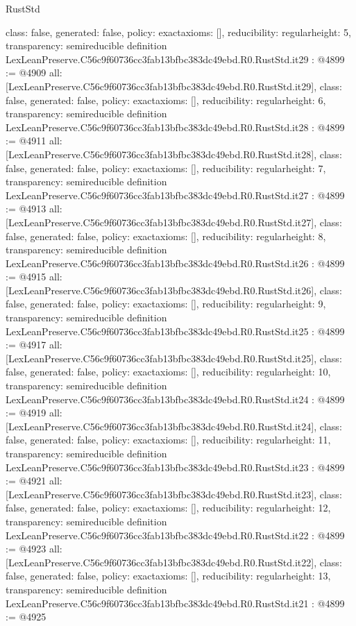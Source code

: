 \begin{lexlean}{RustStd}
\begin{coremodule}
{  class: false,
  generated: false,
  policy: exact{axioms: []},
  reducibility: regular{height: 5},
  transparency: semireducible
}
definition LexLeanPreserve.C56c9f60736cc3fab13bfbc383dc49ebd.R0.RustStd.it29 : @4899 := @4909 {
  all: [LexLeanPreserve.C56c9f60736cc3fab13bfbc383dc49ebd.R0.RustStd.it29],
  class: false,
  generated: false,
  policy: exact{axioms: []},
  reducibility: regular{height: 6},
  transparency: semireducible
}
definition LexLeanPreserve.C56c9f60736cc3fab13bfbc383dc49ebd.R0.RustStd.it28 : @4899 := @4911 {
  all: [LexLeanPreserve.C56c9f60736cc3fab13bfbc383dc49ebd.R0.RustStd.it28],
  class: false,
  generated: false,
  policy: exact{axioms: []},
  reducibility: regular{height: 7},
  transparency: semireducible
}
definition LexLeanPreserve.C56c9f60736cc3fab13bfbc383dc49ebd.R0.RustStd.it27 : @4899 := @4913 {
  all: [LexLeanPreserve.C56c9f60736cc3fab13bfbc383dc49ebd.R0.RustStd.it27],
  class: false,
  generated: false,
  policy: exact{axioms: []},
  reducibility: regular{height: 8},
  transparency: semireducible
}
definition LexLeanPreserve.C56c9f60736cc3fab13bfbc383dc49ebd.R0.RustStd.it26 : @4899 := @4915 {
  all: [LexLeanPreserve.C56c9f60736cc3fab13bfbc383dc49ebd.R0.RustStd.it26],
  class: false,
  generated: false,
  policy: exact{axioms: []},
  reducibility: regular{height: 9},
  transparency: semireducible
}
definition LexLeanPreserve.C56c9f60736cc3fab13bfbc383dc49ebd.R0.RustStd.it25 : @4899 := @4917 {
  all: [LexLeanPreserve.C56c9f60736cc3fab13bfbc383dc49ebd.R0.RustStd.it25],
  class: false,
  generated: false,
  policy: exact{axioms: []},
  reducibility: regular{height: 10},
  transparency: semireducible
}
definition LexLeanPreserve.C56c9f60736cc3fab13bfbc383dc49ebd.R0.RustStd.it24 : @4899 := @4919 {
  all: [LexLeanPreserve.C56c9f60736cc3fab13bfbc383dc49ebd.R0.RustStd.it24],
  class: false,
  generated: false,
  policy: exact{axioms: []},
  reducibility: regular{height: 11},
  transparency: semireducible
}
definition LexLeanPreserve.C56c9f60736cc3fab13bfbc383dc49ebd.R0.RustStd.it23 : @4899 := @4921 {
  all: [LexLeanPreserve.C56c9f60736cc3fab13bfbc383dc49ebd.R0.RustStd.it23],
  class: false,
  generated: false,
  policy: exact{axioms: []},
  reducibility: regular{height: 12},
  transparency: semireducible
}
definition LexLeanPreserve.C56c9f60736cc3fab13bfbc383dc49ebd.R0.RustStd.it22 : @4899 := @4923 {
  all: [LexLeanPreserve.C56c9f60736cc3fab13bfbc383dc49ebd.R0.RustStd.it22],
  class: false,
  generated: false,
  policy: exact{axioms: []},
  reducibility: regular{height: 13},
  transparency: semireducible
}
definition LexLeanPreserve.C56c9f60736cc3fab13bfbc383dc49ebd.R0.RustStd.it21 : @4899 := @4925 {
}
\end{coremodule}
\end{lexlean}
